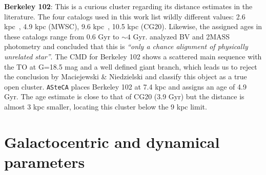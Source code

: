 \documentclass[referee]{aa}
\begin{document}
\begin{appendix}
  \noindent \textbf{Berkeley 102}: This is a curious cluster regarding its distance
  estimates in the literature. The four catalogs used in this work list wildly
  different values: 2.6 kpc~\citep[WEBDA;][]{Tadross_2008}, 4.9 kpc (MWSC),
  9.6 kpc~\citep[OC02;][]{Hasegawa_2008}, 10.5 kpc (CG20). Likewise, the
  assigned ages in these catalogs range from 0.6 Gyr to $\sim4$ Gyr.
  \cite{Maciejewski_2008} analyzed BV and 2MASS photometry and concluded that
  this is \emph{``only a chance alignment of physically unrelated star''}.
  The CMD for Berkeley 102 shows a scattered main sequence with the TO at G=18.5
  mag and a well defined giant branch, which leads us to reject the conclusion
  by Maciejewski \& Niedzielski and classify this object as a true open cluster.
  \texttt{ASteCA} places Berkeley 102 at 7.4 kpc and assigns an age of 4.9 Gyr.
  The age estimate is close to that of CG20 (3.9 Gyr) but the distance is
  almost 3 kpc smaller, locating this cluster below the 9 kpc limit.\\



\section{Galactocentric and dynamical parameters}
  \label{app:galac_dynam}


\end{appendix}
\end{document}
